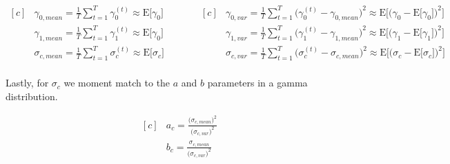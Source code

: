 \documentclass[12pt, oneside]{article}
\begin{document}
\begin{enumerate}[leftmargin=*]
\begin{equation*}
\begin{aligned}[c]
& \gamma_{0,mean} = \frac{1}{T}\sum^{T}_{t=1}\gamma_{0}^{(t)} \approx \textrm{E}\big[\gamma_{0}\big] \\
& \gamma_{1,mean} = \frac{1}{T}\sum^{T}_{t=1}\gamma_{1}^{(t)} \approx \textrm{E}\big[\gamma_{0}\big] \\
& \sigma_{c,mean} = \frac{1}{T}\sum^{T}_{t=1}\sigma_{c}^{(t)} \approx \textrm{E}\big[\sigma_{c}\big] \\
\end{aligned}\quad\quad\quad
\begin{aligned}[c]
& \gamma_{0,var} = \frac{1}{T}\sum^{T}_{t=1}\big(\gamma_{0}^{(t)}-\gamma_{0,mean}\big)^{2} \approx \textrm{E}\big[\big(\gamma_{0}- \textrm{E}\big[\gamma_{0} \big]\big)^{2}\big]\\
& \gamma_{1,var} = \frac{1}{T}\sum^{T}_{t=1}\big(\gamma_{1}^{(t)}-\gamma_{1,mean}\big)^{2} \approx \textrm{E}\big[\big(\gamma_{1}- \textrm{E}\big[\gamma_{1} \big]\big)^{2}\big]\\
& \sigma_{c,var} = \frac{1}{T}\sum^{T}_{t=1}\big(\sigma_{c}^{(t)}-\sigma_{c,mean}\big)^{2} \approx \textrm{E}\big[\big(\sigma_{c}- \textrm{E}\big[\sigma_{c} \big]\big)^{2}\big]\\
\end{aligned}
\end{equation*}

\vspace{5 mm}

Lastly, for $\sigma_{c}$ we moment match to the $a$ and $b$ parameters in a gamma distribution.

\begin{equation*}
\begin{aligned}[c]
& a_{c} = \frac{\big(\sigma_{c,mean}\big)^{2}}{\big(\sigma_{c,var}\big)^{2}} \\
& b_{c} = \frac{\sigma_{c,mean}}{\big(\sigma_{c,var}\big)^{2}}
\end{aligned}
\end{equation*}
\fi

\end{enumerate}
\end{document}
